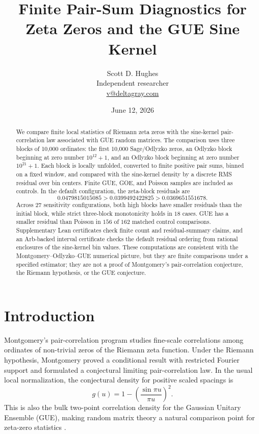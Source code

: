 \documentclass[11pt]{article}
\title{Finite Pair-Sum Diagnostics for Zeta Zeros and the GUE Sine Kernel}
\author{Scott D. Hughes\\
Independent researcher\\
\href{mailto:v@deltagray.com}{v@deltagray.com}}
\date{June 12, 2026}
\begin{document}
\maketitle

\begin{abstract}
We compare finite local statistics of Riemann zeta zeros with the sine-kernel pair-correlation law associated with GUE random matrices.  The comparison uses three blocks of 10,000 ordinates: the first 10,000 Sage/Odlyzko zeros, an Odlyzko block beginning at zero number $10^{12}+1$, and an Odlyzko block beginning at zero number $10^{21}+1$.  Each block is locally unfolded, converted to finite positive pair sums, binned on a fixed window, and compared with the sine-kernel density by a discrete RMS residual over bin centers.  Finite GUE, GOE, and Poisson samples are included as controls.  In the default configuration, the zeta-block residuals are
\[
0.0479815015085 > 0.0399492422825 > 0.0369651551678.
\]
Across $27$ sensitivity configurations, both high blocks have smaller residuals than the initial block, while strict three-block monotonicity holds in $18$ cases.  GUE has a smaller residual than Poisson in $156$ of $162$ matched control comparisons.  Supplementary Lean certificates check finite count and residual-summary claims, and an Arb-backed interval certificate checks the default residual ordering from rational enclosures of the sine-kernel bin values.  These computations are consistent with the Montgomery--Odlyzko--GUE numerical picture, but they are finite comparisons under a specified estimator; they are not a proof of Montgomery's pair-correlation conjecture, the Riemann hypothesis, or the GUE conjecture.
\end{abstract}

\section{Introduction}

Montgomery's pair-correlation program studies fine-scale correlations among ordinates of non-trivial zeros of the Riemann zeta function.  Under the Riemann hypothesis, Montgomery proved a conditional result with restricted Fourier support and formulated a conjectural limiting pair-correlation law.  In the usual local normalization, the conjectural density for positive scaled spacings is
\[
  g(u)=1-\left(\frac{\sin \pi u}{\pi u}\right)^2.
\]
This is also the bulk two-point correlation density for the Gaussian Unitary Ensemble (GUE), making random matrix theory a natural comparison point for zeta-zero statistics \cite{montgomery1973pair,mehtaRandomMatrices}.
\end{document}

